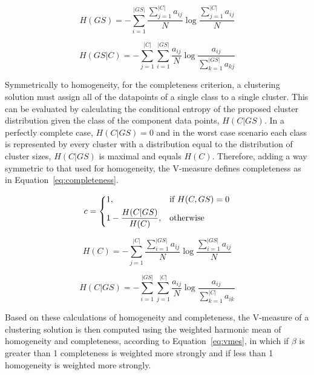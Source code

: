 \begin{equation}
 H(GS) = - \sum_{i=1}^{|GS|} \frac{\sum_{j=1}^{|C|} a_{ij}}{N}
         \log \frac{\sum_{j=1}^{|C|} a_{ij}}{N}
\end{equation}

\begin{equation}
 H(GS|C) = - \sum_{j=1}^{|C|} \sum_{i=1}^{|GS|} \frac{a_{ij}}{N}
           \log \frac{a_{ij}}{\sum_{k=1}^{|GS|} a_{kj}}
\end{equation}

Symmetrically to homogeneity, for the completeness criterion, a clustering
solution must assign all of the datapoints of a single class to a single
cluster. This can be evaluated by calculating the conditional entropy of the
proposed cluster distribution given the class of the component data points,
$H(C|GS)$. In a perfectly complete case, $H(C|GS) = 0$ and in the worst case
scenario each class is represented by every cluster with a distribution equal to
the distribution of cluster sizes, $H(C|GS)$ is maximal and equals $H(C)$.
Therefore, adding a way symmetric to that used for homogeneity, the V-measure
defines completeness as in Equation~\ref{eq:completeness}.

\begin{equation} \label{eq:completeness}
 c = \begin{dcases}
      1,                        & \text{if } H(C,GS) = 0 \\
      1 - \frac{H(C|GS)}{H(C)}, & \text{otherwise} \\
     \end{dcases}
\end{equation}

\begin{equation}
 H(C) = - \sum_{j=1}^{|C|} \frac{\sum_{i=1}^{|GS|} a_{ij}}{N}
        \log \frac{\sum_{i=1}^{|GS|} a_{ij}}{N}
\end{equation}

\begin{equation}
 H(C|GS) = - \sum_{i=1}^{|GS|} \sum_{j=1}^{|C|} \frac{a_{ij}}{N}
           \log \frac{a_{ij}}{\sum_{k=1}^{|C|} a_{ik}}
\end{equation}

Based on these calculations of homogeneity and completeness, the V-measure of a
clustering solution is then computed using the weighted harmonic mean of
homogeneity and completeness, according to Equation~\ref{eq:vmes}, in which if
$\beta$ is greater than 1 completeness is weighted more strongly and if less
than 1 homogeneity is weighted more strongly.

